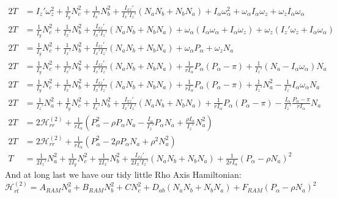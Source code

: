 \documentclass{article}
\begin{document}
\begin{align}
	2T &=  I_{z}'\omega_{z}^{2} + \frac{1}{I_{y}}N_{c}^{2} + \frac{1}{I_{x}'}N_{b}^{2} + \frac{I_{xz}'}{I_{x}'I_{z}'}\left(N_{a}N_{b} + N_{b}N_{a}\right) + I_{\alpha}\omega_{\alpha}^{2} + \omega_{\alpha}I_{\alpha}\omega_{z} + \omega_{z}I_{\alpha}\omega_{\alpha} \\
	2T &= \frac{1}{I_{y}}N_{c}^{2} + \frac{1}{I_{x}'}N_{b}^{2} + \frac{I_{xz}'}{I_{x}'I_{z}'}\left(N_{a}N_{b} + N_{b}N_{a}\right) + \omega_{\alpha}\left(I_{\alpha}\omega_{\alpha} + I_{\alpha}\omega_{z}\right) + \omega_{z}\left(I_{z}'\omega_{z} + I_{\alpha}\omega_{\alpha}\right) \\
	2T &= \frac{1}{I_{y}}N_{c}^{2} + \frac{1}{I_{x}'}N_{b}^{2} + \frac{I_{xz}'}{I_{x}'I_{z}'}\left(N_{a}N_{b} + N_{b}N_{a}\right) + \omega_{\alpha}P_{\alpha} + \omega_{z}N_{a} \\
	2T &= \frac{1}{I_{y}}N_{c}^{2} + \frac{1}{I_{x}'}N_{b}^{2} + \frac{I_{xz}'}{I_{x}'I_{z}'}\left(N_{a}N_{b} + N_{b}N_{a}\right) + \frac{1}{rI_{\alpha}}P_{\alpha}(P_{\alpha}-\pi) + \frac{1}{I_{z}'}\left( N_{a} - I_{\alpha}\omega_{\alpha} \right)N_{a} \\
	2T &= \frac{1}{I_{y}}N_{c}^{2} + \frac{1}{I_{x}'}N_{b}^{2} + \frac{I_{xz}'}{I_{x}'I_{z}'}\left(N_{a}N_{b} + N_{b}N_{a}\right) + \frac{1}{rI_{\alpha}}P_{\alpha}(P_{\alpha}-\pi) + \frac{1}{I_{z}'}N_{a}^{2} - \frac{1}{I_{z}'}I_{\alpha}\omega_{\alpha}N_{a} \\
	2T &= \frac{1}{I_{z}'}N_{a}^{2} + \frac{1}{I_{y}}N_{c}^{2} + \frac{1}{I_{x}'}N_{b}^{2} + \frac{I_{xz}'}{I_{x}'I_{z}'}\left(N_{a}N_{b} + N_{b}N_{a}\right) + \frac{1}{rI_{\alpha}}P_{\alpha}(P_{\alpha}-\pi) - \frac{I_{\alpha}}{I_{z}'}\frac{P_{\alpha}-\pi}{rI_{\alpha}}N_{a} \\
	2T &= 2\mathscr{H}_{rr}^{(2)} + \frac{1}{rI_{\alpha}}(P_{\alpha}^{2}-\rho P_{\alpha}N_{a} - \frac{I_{\alpha}}{I_{z}'}P_{\alpha}N_{a} + \frac{\rho I_{\alpha}}{I_{z}'}N_{a}^{2}) \\
	2T &= 2\mathscr{H}_{rr}^{(2)} + \frac{1}{rI_{\alpha}}(P_{\alpha}^{2} - 2\rho P_{\alpha}N_{a} + \rho^{2} N_{a}^{2}) \\
	T &=  \frac{1}{2I_{z}'}N_{a}^{2} + \frac{1}{2I_{y}}N_{c}^{2} + \frac{1}{2I_{x}'}N_{b}^{2} + \frac{I_{xz}'}{2I_{x}'I_{z}'}\left(N_{a}N_{b} + N_{b}N_{a}\right) + \frac{1}{2rI_{\alpha}}(P_{\alpha} - \rho N_{a})^{2}
\end{align}
And at long last we have our tidy little Rho Axis Hamiltonian:
\begin{equation}
	\mathscr{H}_{rt}^{(2)} = A_{RAM}N_{a}^{2} + B_{RAM}N_{b}^{2} + CN_{c}^{2} + D_{ab}\left(N_{a}N_{b} + N_{b}N_{a}\right) + F_{RAM}(P_{\alpha} - \rho N_{a})^{2}
\end{equation}
\end{document}
